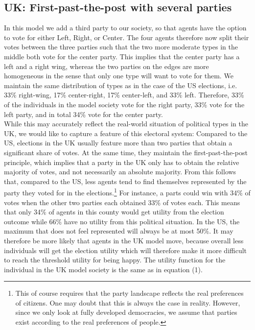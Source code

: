 \documentclass[12pt, a4paper]{article}
\begin{document}
 \subsection{UK: First-past-the-post with several parties}
 In this model we add a third party to our society, so that agents have the option to vote for either Left, Right, or Center. The four agents therefore now split their votes between the three parties such that the two more moderate types in the middle both vote for the center party. This implies that the center party has a left and a right wing, whereas the two parties on the edges are more homogeneous in the sense that only one type will want to vote for them. We maintain the same distribution of types as in the case of the US elections, i.e. 33\% right-wing, 17\% center-right, 17\% center-left, and 33\% left. Therefore, 33\% of the individuals in the model society vote for the right party, 33\% vote for the left party, and in total 34\% vote for the center party. \\
 While this may accurately reflect the real-world situation of political types in the UK, we would like to capture a feature of this electoral system: Compared to the US, elections in the UK usually feature more than two parties that obtain a significant share of votes. At the same time, they maintain the first-past-the-post principle, which implies that a party in the UK only has to obtain the relative majority of votes, and not necessarily an absolute majority. From this follows that, compared to the US, less agents tend to find themselves represented by the party they voted for in the elections.\footnote{This of course requires that the party landscape reflects the real preferences of citizens. One may doubt that this is always the case in reality. However, since we only look at fully developed democracies, we assume that parties exist according to the real preferences of people.} For instance, a parts could win with 34\% of votes when the other two parties each obtained 33\% of votes each. This means that only 34\% of agents in this county would get utility from the election outcome while 66\% have no utility from this political situation. In the US, the maximum that does not feel represented will always be at most 50\%. It may therefore be more likely that agents in the UK model move, because overall less individuals will get the election utility which will therefore make it more difficult to reach the threshold utility for being happy.
 The utility function for the individual in the UK model society is the same as in equation (1).
\end{document}
